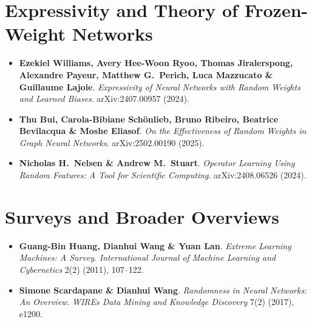 \documentclass[11pt]{article}
\begin{document}
\section{Expressivity and Theory of Frozen-Weight Networks}
\begin{itemize}[leftmargin=1.2em]
  \item \textbf{Ezekiel Williams, Avery Hee-Woon Ryoo, Thomas Jiralerspong, Alexandre Payeur, Matthew G.~Perich, Luca Mazzucato \& Guillaume Lajoie}.  
        \emph{Expressivity of Neural Networks with Random Weights and Learned Biases}.  
        arXiv:2407.00957 (2024).

  \item \textbf{Thu Bui, Carola-Bibiane Schönlieb, Bruno Ribeiro, Beatrice Bevilacqua \& Moshe Eliasof}.  
        \emph{On the Effectiveness of Random Weights in Graph Neural Networks}.  
        arXiv:2502.00190 (2025).

  \item \textbf{Nicholas H.~Nelsen \& Andrew M.~Stuart}.  
        \emph{Operator Learning Using Random Features: A Tool for Scientific Computing}.  
        arXiv:2408.06526 (2024).
\end{itemize}

\section{Surveys and Broader Overviews}
\begin{itemize}[leftmargin=1.2em]
  \item \textbf{Guang-Bin Huang, Dianhui Wang \& Yuan Lan}.  
        \emph{Extreme Learning Machines: A Survey}.  
        \textit{International Journal of Machine Learning and Cybernetics} 2(2) (2011), 107--122.

  \item \textbf{Simone Scardapane \& Dianhui Wang}.  
        \emph{Randomness in Neural Networks: An Overview}.  
        \textit{WIREs Data Mining and Knowledge Discovery} 7(2) (2017), e1200.
\end{itemize}
\end{document}
